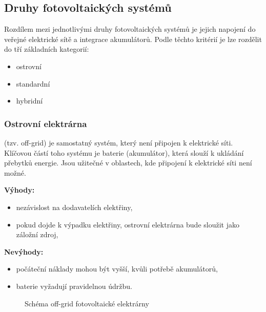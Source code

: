 \subsection{Druhy fotovoltaických systémů}

Rozdílem mezi jednotlivými druhy fotovoltaických systémů je jejich napojení do veřejné elektrické sítě a integrace akumulátorů.
Podle těchto kritérií je lze rozdělit do tří základních kategorií:

\begin{itemize}
    \item ostrovní
    \item standardní
    \item hybridní
\end{itemize}

\subsubsection{Ostrovní elektrárna}

(tzv. off-grid) je samostatný systém, který není připojen k elektrické síti.
Klíčovou částí toho systému je baterie (akumulátor), která slouží k ukládání přebytků energie.
Jsou užitečné v oblastech, kde připojení k elektrické síti není možné.

\begin{multicols}{2}
    \textbf{Výhody:}
    \begin{itemize}[leftmargin=*]
        \item nezávislost na dodavatelích elektřiny,
        \item pokud dojde k výpadku elektřiny, ostrovní elektrárna bude sloužit jako záložní zdroj,
    \end{itemize}
    
    \columnbreak
    
    \textbf{Nevýhody:}
    \begin{itemize}[leftmargin=*]
        \item počáteční náklady mohou být vyšší, kvůli potřebě akumulátorů,
        \item baterie vyžadují pravidelnou údržbu.
    \end{itemize}
\end{multicols}

\begin{figure}[h]
    \centering
    \caption{Schéma off-grid fotovoltaické elektrárny}
    \label{fig:offgrid_schema}
\end{figure}


